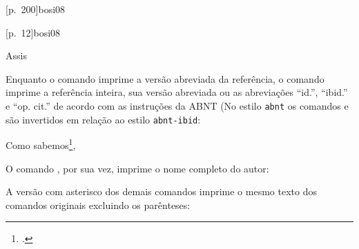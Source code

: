 \documentclass[a4paper]{article}
\begin{document}
\begin{example}
\cites{mann09}{moretti09:1, moretti09}
\end{example}

\begin{example}
[p.~200]{bosi08}
\end{example}

\begin{example}
[p.~12]{bosi08}
\end{example}

\begin{example}
\end{example}

\begin{example}
Assis \cite[apud][p.~200]{bosi08}
\end{example}


Enquanto o comando \PVerb{\footcite} imprime a versão abreviada da referência, o comando \PVerb{\footcite*} imprime a referência inteira, sua versão
abreviada ou as abreviações ``id.'', ``ibid.'' e ``op. cit.'' de acordo com
as instruções da ABNT (No estilo \texttt{abnt} os comandos \PVerb{\footcite} e \PVerb{\footcite*} são invertidos em relação ao estilo \texttt{abnt-ibid}:

\begin{example}
Como sabemos\footcite*[Cf.][]{assis08},
\end{example}

O comando \PVerb{\textcite*}, por sua vez, imprime o nome completo do autor:

\begin{example}
\textcite*{bosi08}
\end{example}

A versão com asterisco dos demais comandos imprime o mesmo texto dos comandos
originais excluindo os parênteses:

\begin{example}
\cite*{bosi08}
\end{example}

\begin{example}
\end{example}

\begin{example}
\citeauthor*{bosi08}
\end{example}

\begin{example}
\citeyear*{bosi08}
\end{example}
\end{document}

